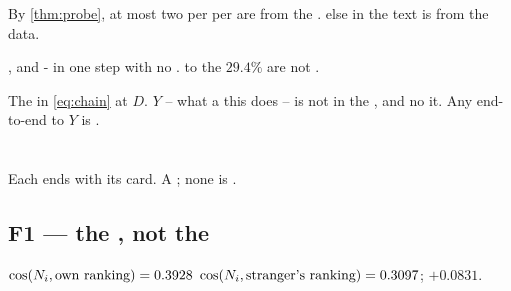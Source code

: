 \begin{proposition}
By \cref{thm:probe}, at most two  per  per  are 
from the .  else in the  text is  from the
  data.
\end{proposition}

\begin{proposition}
,  and -  in one step with no .
   to the $29.4\%$  are not .
\end{proposition}

\begin{proposition}
The  in \cref{eq:chain}  at $D$. $Y$ -- what a   
this  does -- is not in the , and no   it. Any
end-to-end   to $Y$ is .
\end{proposition}

\section{}
\label{sec:findings}

Each  ends with its  card. A   
\textsc{}; none is .

\subsection{F1 --- the   , not the }

$\cos(N_i,\text{own ranking}) = 0.3928$ 
$\cos(N_i,\text{stranger's ranking}) = 0.3097$;  $+0.0831$.

